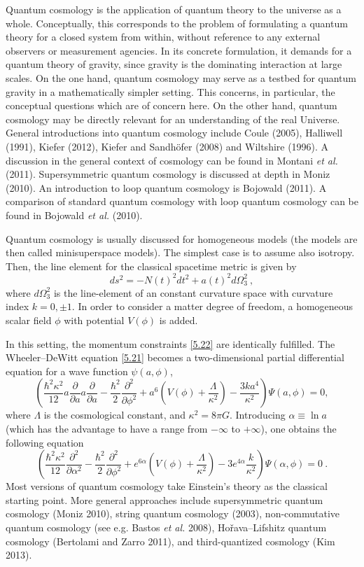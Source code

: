 \documentclass[12pt,a4paper]{article}
\newcommand{\be}{\begin{equation}}
\newcommand{\ee}{\end{equation}}
\newcommand{\lb}{\label}
\begin{document}
Quantum cosmology is the application of quantum theory to the universe
as a whole. Conceptually, this corresponds to the problem of
formulating a quantum theory for a closed system from within, without
reference to any external observers or measurement agencies. In its
concrete formulation, it demands for a quantum theory of gravity,
since gravity is the dominating interaction at large scales. On the
one hand, quantum cosmology may serve as a testbed for quantum gravity
in a mathematically simpler setting. This concerns, in particular, the
conceptual questions which are of concern here. On the other hand,
quantum cosmology may be directly relevant for an understanding of the
real Universe. General introductions into quantum cosmology include
Coule (2005), Halliwell (1991), Kiefer (2012), Kiefer and Sandh\"ofer
(2008) and Wiltshire (1996). A
discussion in the general context of cosmology can be found in Montani
{\em et al.} (2011). Supersymmetric quantum cosmology is discussed at
depth in Moniz (2010). An introduction to loop quantum cosmology is
Bojowald (2011). A comparison of standard quantum cosmology with loop
quantum cosmology can be found in Bojowald {\em et al.} (2010). 

Quantum cosmology is usually discussed for homogeneous models
(the models are then called minisuperspace models). The
simplest case is to assume also isotropy. Then,
the line element for the classical spacetime metric is given by
\be
ds^2=-N(t)^2dt^2+a(t)^2d\Omega_3^2\ ,
\ee
where $d\Omega_3^2$ is the line-element of an constant curvature space 
with curvature index $k=0,\pm 1$. In order to consider a matter degree
of freedom, a homogeneous scalar field $\phi$ with potential $V(\phi)$
is added. 

In this setting, the momentum
constraints \eqref{5.22} are identically fulfilled. The
Wheeler--DeWitt equation \eqref{5.21} becomes a two-dimensional
partial differential equation for a wave function $\psi(a,\phi)$,
\be
\lb{wdw1}
\left(\frac{\hbar^2\kappa^2}{12}a\frac{\partial}{\partial a}
a\frac{\partial}{\partial a}-\frac{\hbar^2}{2}\frac{\partial^2}
{\partial\phi^2}+a^6\left(V(\phi)
+\frac{\Lambda}{\kappa^2}\right)-\frac{3ka^4}{\kappa^2}\right)
\Psi(a,\phi)=0 ,
\ee
where $\Lambda$ is the cosmological constant, and $\kappa^2=8\pi G$. 
Introducing $\alpha\equiv\ln a$
(which has the advantage to have a range from $-\infty$ to $+\infty$),
one obtains the following equation 
\be
\lb{wdw2}
\left(\frac{\hbar^2\kappa^2}{12}\frac{\partial^2}{\partial\alpha^2}-
\frac{\hbar^2}{2}\frac{\partial^2}{\partial\phi^2}+ 
e^{6\alpha}\left(V\left(\phi\right)+
\frac{\Lambda}{\kappa^2}\right)
-3e^{4\alpha}\frac{k}{\kappa^2}\right)\Psi(\alpha,\phi)=0 
\ . 
\ee
Most versions of quantum cosmology take Einstein's theory as the
classical starting point. More general approaches include
supersymmetric quantum cosmology (Moniz 2010), string quantum
cosmology (2003), non-commutative
quantum cosmology (see e.g. Bastos {\em et al.} 2008), 
Ho\v{r}ava--Lifshitz quantum cosmology (Bertolami and Zarro 2011),
and third-quantized cosmology (Kim 2013).
\end{document}
